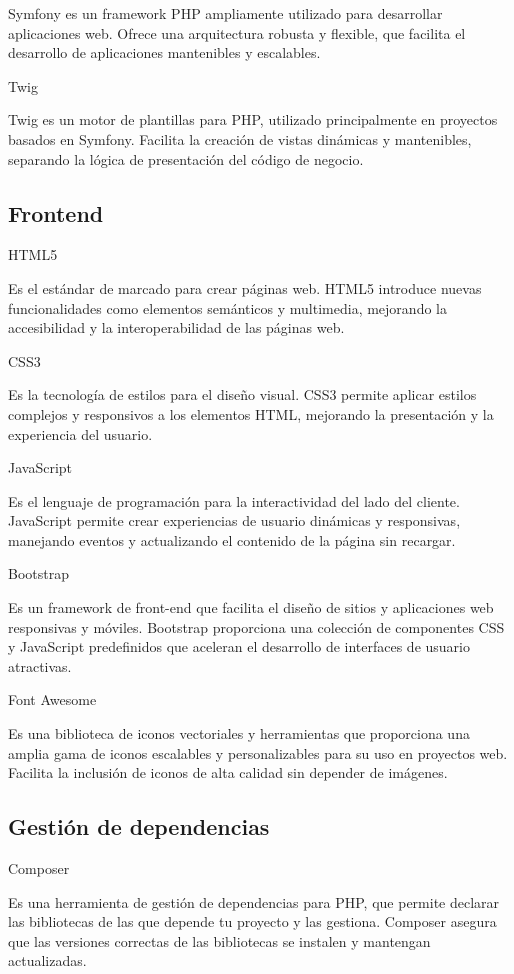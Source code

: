 Symfony es un framework PHP ampliamente utilizado para desarrollar aplicaciones web.
Ofrece una arquitectura robusta y flexible, que facilita el desarrollo de aplicaciones mantenibles y escalables.

Twig

Twig es un motor de plantillas para PHP, utilizado principalmente en proyectos basados en
Symfony.
Facilita la creación de vistas dinámicas y mantenibles, separando la lógica de presentación del código de negocio.

\subsection*{Frontend}

HTML5

Es el estándar de marcado para crear páginas web.
HTML5 introduce nuevas funcionalidades como elementos semánticos y multimedia, mejorando la accesibilidad y la
interoperabilidad de las páginas web.

CSS3

Es la tecnología de estilos para el diseño visual.
CSS3 permite aplicar estilos complejos y responsivos a los elementos HTML, mejorando la presentación y la experiencia
del usuario.

JavaScript

Es el lenguaje de programación para la interactividad del lado del cliente.
JavaScript permite crear experiencias de usuario dinámicas y responsivas, manejando eventos y actualizando el contenido
de la página sin recargar.

Bootstrap

Es un framework de front-end que facilita el diseño de sitios y aplicaciones web
responsivas y móviles.
Bootstrap proporciona una colección de componentes CSS
y JavaScript predefinidos que aceleran el desarrollo de interfaces de usuario atractivas.

Font Awesome

Es una biblioteca de iconos vectoriales y herramientas que proporciona una amplia gama de
iconos escalables y personalizables para su uso en proyectos web.
Facilita la inclusión de iconos de alta calidad sin depender de imágenes.

\subsection*{Gestión de dependencias}

Composer

Es una herramienta de gestión de dependencias para PHP, que
permite declarar las bibliotecas de las que depende tu proyecto
y las gestiona.
Composer asegura que las versiones correctas de las bibliotecas se instalen y mantengan actualizadas.

